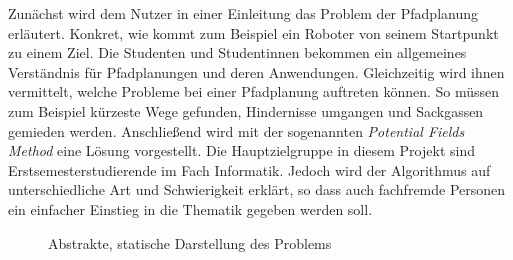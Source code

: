 Zunächst wird dem Nutzer in einer Einleitung das Problem der Pfadplanung erläutert. Konkret, wie kommt zum Beispiel ein Roboter von seinem Startpunkt zu einem Ziel. Die Studenten und Studentinnen bekommen ein allgemeines Verständnis für Pfadplanungen und deren Anwendungen. Gleichzeitig wird ihnen vermittelt, welche Probleme bei einer Pfadplanung auftreten können. So müssen zum Beispiel kürzeste Wege gefunden, Hindernisse umgangen und Sackgassen gemieden werden. Anschließend wird mit der sogenannten \textit{Potential Fields Method} eine Lösung vorgestellt. Die Hauptzielgruppe in diesem Projekt sind Erstsemesterstudierende im Fach Informatik. Jedoch wird der Algorithmus auf unterschiedliche Art und Schwierigkeit erklärt, so dass auch fachfremde Personen ein einfacher Einstieg in die Thematik gegeben werden soll. 


\begin{figure}[ht!]
  \centering
  \caption{Abstrakte, statische Darstellung des Problems}
  \label{fig:bbstatic}
\end{figure}


